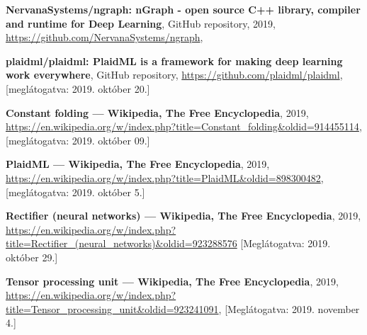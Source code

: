 \begin{thebibliography}{9}

	\textbf{NervanaSystems/ngraph: nGraph - open source C++ library, compiler and runtime for Deep Learning},
	GitHub repository,
	2019,
	\newline\url{https://github.com/NervanaSystems/ngraph},

	\textbf{plaidml/plaidml: PlaidML is a framework for making deep learning work everywhere},
	GitHub repository,
	\newline\url{https://github.com/plaidml/plaidml},
	[meglátogatva: 2019. október 20.]


	\textbf{Constant folding --- {Wikipedia}{,} The Free Encyclopedia},
	2019,
	\newline\url{https://en.wikipedia.org/w/index.php?title=Constant_folding&oldid=914455114},
	[meglátogatva: 2019. október 09.]
	
	\textbf{PlaidML --- {Wikipedia}{,} The Free Encyclopedia},
	2019,
	\newline\url{https://en.wikipedia.org/w/index.php?title=PlaidML&oldid=898300482},
	[meglátogatva: 2019. október 5.]
	
	\textbf{Rectifier (neural networks) --- {Wikipedia}{,} The Free Encyclopedia},
	2019,
	\newline\url{ https://en.wikipedia.org/w/index.php?title=Rectifier_(neural_networks)&oldid=923288576}
	[Meglátogatva: 2019. október 29.]
	
	\textbf{Tensor processing unit --- {Wikipedia}{,} The Free Encyclopedia},
	2019,
	\newline\url{https://en.wikipedia.org/w/index.php?title=Tensor_processing_unit&oldid=923241091},
	[Meglátogatva: 2019. november 4.]

\end{thebibliography}